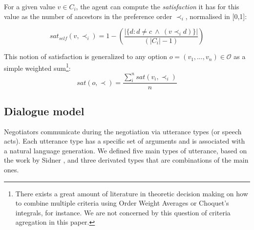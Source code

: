 \documentclass{llncs}
\begin{document}
	For a given value $v\in C_i$, the agent can compute the \emph{satisfaction} it has for this value as the number of ancestors in the preference order $\prec_i$, normalised in [0,1]:
	
	\begin{equation}
	sat_{self}(v, \prec_i) =	1 - \left( \frac{|\{d : d \neq c \  \wedge \ (v \prec_i d)\}| }{( |C_i| - 1 )}\right)
	\end{equation}
	
	This notion of satisfaction is generalized to any option $o=(v_1,\ldots,v_n) \in \mathcal{O}$ as a simple weighted sum\footnote{There exists a great amount of literature in theoretic decision making on how to combine multiple criteria using Order Weight Averages or Choquet's integrals, for instance. We are not concerned by this question of criteria agregation in this paper.}:
	\begin{equation}
	sat(o, \prec) = \frac{\sum_{i}^{n} sat(v_i, \prec_i) }{n}
	\end{equation}
	
	\subsection{Dialogue model}
	Negotiators communicate during the negotiation via utterance types (or speech acts). Each utterance type has a specific set of arguments and is associated with a natural language generation. We defined five main types of utterance, based on the work by Sidner \cite{sidnerartificial}, and three derivated types that are combinations of the main ones.
		
\end{document}
